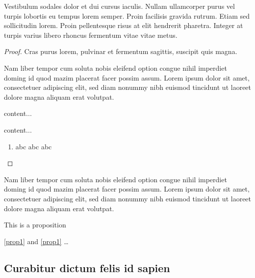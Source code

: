 \documentclass[a4paper,UKenglish,cleveref, autoref, thm-restate]{lipics-v2021}
\begin{document}
\begin{lemma}
\label{lemma:lorem}
Vestibulum sodales dolor et dui cursus iaculis. Nullam ullamcorper purus vel turpis lobortis eu tempus lorem semper. Proin facilisis gravida rutrum. Etiam sed sollicitudin lorem. Proin pellentesque risus at elit hendrerit pharetra. Integer at turpis varius libero rhoncus fermentum vitae vitae metus.
\end{lemma}

\begin{proof}
Cras purus lorem, pulvinar et fermentum sagittis, suscipit quis magna.

Nam liber tempor cum soluta nobis eleifend option congue nihil imperdiet doming id quod mazim placerat facer possim assum. Lorem ipsum dolor sit amet, consectetuer adipiscing elit, sed diam nonummy nibh euismod tincidunt ut laoreet dolore magna aliquam erat volutpat.
\begin{claim}
content...
\end{claim}
\begin{claimproof}
content...
    \begin{enumerate}
        \item abc abc abc \claimqedhere{}
    \end{enumerate}
\end{claimproof}

\end{proof}

\begin{corollary}
\label{lemma:curabitur}
Nam liber tempor cum soluta nobis eleifend option congue nihil imperdiet doming id quod mazim placerat facer possim assum. Lorem ipsum dolor sit amet, consectetuer adipiscing elit, sed diam nonummy nibh euismod tincidunt ut laoreet dolore magna aliquam erat volutpat.
\end{corollary}

\begin{proposition}\label{prop1}
This is a proposition
\end{proposition}

\autoref{prop1} and \cref{prop1} \ldots

\subsection{Curabitur dictum felis id sapien}
\end{document}
